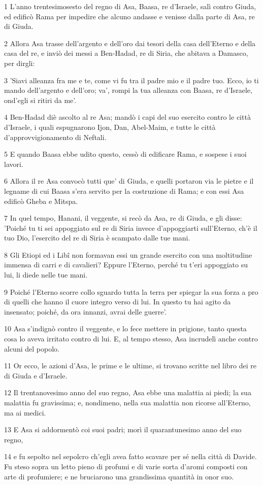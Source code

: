 \par 1 L'anno trentesimosesto del regno di Asa, Baasa, re d'Israele, salì contro Giuda, ed edificò Rama per impedire che alcuno andasse e venisse dalla parte di Asa, re di Giuda.
\par 2 Allora Asa trasse dell'argento e dell'oro dai tesori della casa dell'Eterno e della casa del re, e inviò dei messi a Ben-Hadad, re di Siria, che abitava a Damasco, per dirgli:
\par 3 'Siavi alleanza fra me e te, come vi fu tra il padre mio e il padre tuo. Ecco, io ti mando dell'argento e dell'oro; va', rompi la tua alleanza con Baasa, re d'Israele, ond'egli si ritiri da me'.
\par 4 Ben-Hadad diè ascolto al re Asa; mandò i capi del suo esercito contro le città d'Israele, i quali espugnarono Ijon, Dan, Abel-Maim, e tutte le città d'approvvigionamento di Neftali.
\par 5 E quando Baasa ebbe udito questo, cessò di edificare Rama, e sospese i suoi lavori.
\par 6 Allora il re Asa convocò tutti que' di Giuda, e quelli portaron via le pietre e il legname di cui Baasa s'era servito per la costruzione di Rama; e con essi Asa edificò Gheba e Mitspa.
\par 7 In quel tempo, Hanani, il veggente, si recò da Asa, re di Giuda, e gli disse: 'Poiché tu ti sei appoggiato sul re di Siria invece d'appoggiarti sull'Eterno, ch'è il tuo Dio, l'esercito del re di Siria è scampato dalle tue mani.
\par 8 Gli Etiopi ed i Libî non formavan essi un grande esercito con una moltitudine immensa di carri e di cavalieri? Eppure l'Eterno, perché tu t'eri appoggiato su lui, li diede nelle tue mani.
\par 9 Poiché l'Eterno scorre collo sguardo tutta la terra per spiegar la sua forza a pro di quelli che hanno il cuore integro verso di lui. In questo tu hai agito da insensato; poiché, da ora innanzi, avrai delle guerre'.
\par 10 Asa s'indignò contro il veggente, e lo fece mettere in prigione, tanto questa cosa lo aveva irritato contro di lui. E, al tempo stesso, Asa incrudelì anche contro alcuni del popolo.
\par 11 Or ecco, le azioni d'Asa, le prime e le ultime, si trovano scritte nel libro dei re di Giuda e d'Israele.
\par 12 Il trentanovesimo anno del suo regno, Asa ebbe una malattia ai piedi; la sua malattia fu gravissima; e, nondimeno, nella sua malattia non ricorse all'Eterno, ma ai medici.
\par 13 E Asa si addormentò coi suoi padri; morì il quarantunesimo anno del suo regno,
\par 14 e fu sepolto nel sepolcro ch'egli avea fatto scavare per sé nella città di Davide. Fu steso sopra un letto pieno di profumi e di varie sorta d'aromi composti con arte di profumiere; e ne bruciarono una grandissima quantità in onor suo.

